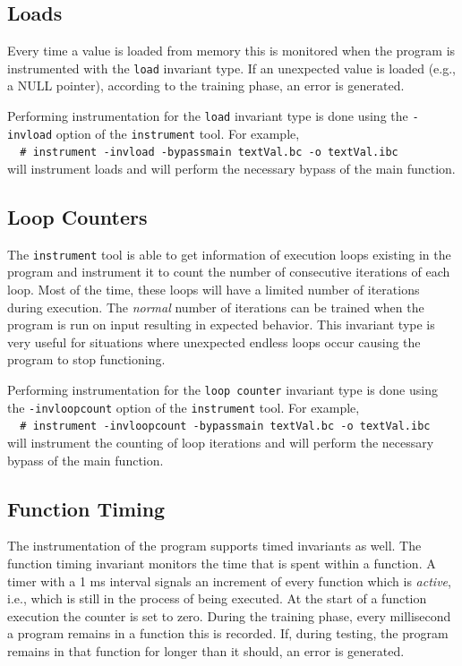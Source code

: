 \subsection{Loads}

		Every time a value is loaded from memory this is monitored when the program is instrumented
		with the \verb|load| invariant type.
		If an unexpected value is loaded (e.g., a NULL pointer), according to the training phase,
		an error is generated.	

		Performing instrumentation for the \verb|load| invariant type is done using the 
		\verb|-invload| option of the \verb|instrument| tool.
		For example,\\
		\verb|  # instrument -invload -bypassmain textVal.bc -o textVal.ibc|\\
		will instrument loads and will perform the necessary bypass of the main function.


\subsection{Loop Counters}

		The \verb|instrument| tool is able to get information of execution loops
		existing in the program
		and instrument it to count the number of consecutive iterations of each loop.
		Most of the time, these loops will have a limited number of iterations during execution.
		The \emph{normal} number of iterations can be trained when the program is run on input
		resulting in expected behavior.
		This invariant type is very useful for situations where unexpected endless loops occur
		causing the program to stop functioning.

		Performing instrumentation for the \verb|loop counter| invariant type is done using the 
		\verb|-invloopcount| option of the \verb|instrument| tool.
		For example,\\
		\verb|  # instrument -invloopcount -bypassmain textVal.bc -o textVal.ibc|\\
		will instrument the counting of loop iterations and will perform the necessary bypass of the main function.

	
\subsection{Function Timing}

		The instrumentation of the program supports timed invariants as well.
		The function timing invariant monitors the time that is spent within a function.
		A timer with a 1 ms interval signals an increment of every function which is \emph{active},
		i.e., which is still in the process of being executed.
		At the start of a function execution the counter is set to zero.
		During the training phase, every millisecond a program remains in a function this is recorded.
		If, during testing, the program remains in that function for longer than it should,
		an error is generated.

